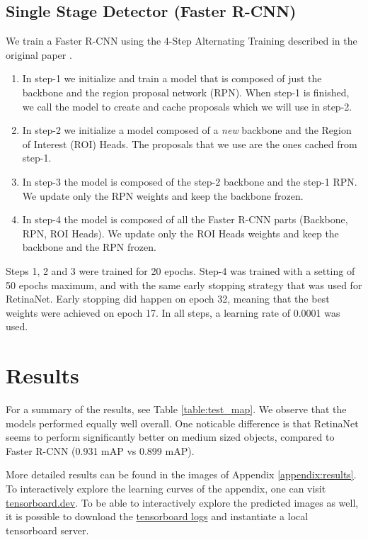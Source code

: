 \documentclass{article}
\begin{document}
\subsection{Single Stage Detector (Faster R-CNN)}

We train a Faster R-CNN using the 4-Step Alternating Training described in the original paper \cite{fasterrcnn}.

\begin{enumerate}
    \item In step-1 we initialize and train a model that is composed of just the backbone and the region proposal network (RPN). When step-1 is finished, we call the model to create and cache proposals which we will use in step-2.
    \item In step-2 we initialize a model composed of a \emph{new} backbone and the Region of Interest (ROI) Heads. The proposals that we use are the ones cached from step-1.
    \item In step-3 the model is composed of the step-2 backbone and the step-1 RPN. We update only the RPN weights and keep the backbone frozen.
    \item In step-4 the model is composed of all the Faster R-CNN parts (Backbone, RPN, ROI Heads). We update only the ROI Heads weights and keep the backbone and the RPN frozen.
\end{enumerate}

Steps 1, 2 and 3 were trained for 20 epochs. Step-4 was trained with a setting of 50 epochs maximum, and with the same early stopping strategy that was used for RetinaNet. Early stopping did happen on epoch 32, meaning that the best weights were achieved on epoch 17. In all steps, a learning rate of 0.0001 was used.

\section{Results}
For a summary of the results, see Table \ref{table:test_map}. We observe that the models performed equally well overall. One noticable difference is that RetinaNet seems to perform significantly better on medium sized objects, compared to Faster R-CNN (0.931 mAP vs 0.899 mAP).

More detailed results can be found in the images of Appendix \ref{appendix:results}. To interactively explore the learning curves of the appendix, one can visit \href{https://tensorboard.dev/experiment/ErXpnafeS6aX9Fleh9lCZQ/}{tensorboard.dev}. To be able to interactively explore the predicted images as well, it is possible to download the \href{https://ntuagr-my.sharepoint.com/:u:/g/personal/konstantinospapadakis_ntua_gr/EdNjt6ZTrDlPtkvl6aJubhsB8nTLo-kJOdELaH411BjGmg?e=64G3z5}{tensorboard logs} and instantiate a local tensorboard server.
\end{document}
